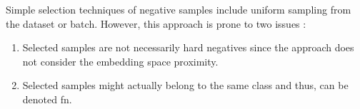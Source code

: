 Simple selection techniques of negative samples include uniform sampling from the dataset or batch.
However, this approach is prone to two issues \cite{robinson_contrastive_2021}:
\begin{enumerate}
    \item Selected samples are not necessarily hard negatives since the approach does not consider the embedding space proximity.
    \item Selected samples might actually belong to the same class and thus, can be denoted \ac{fn}.
\end{enumerate}

